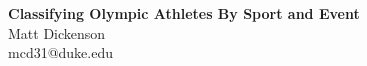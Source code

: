 \documentclass[landscape, paperwidth=42in, paperheight=36in,
fontscale=.35, margin=1in]{baposter}
\begin{document}
\begin{poster}
{        %
\hspace{-1.5in}
} {%
\textsf{
	\bf{Classifying Olympic Athletes By Sport and Event}}
} { %
~\\
  \hspace{-1in}
	\vspace{1em} \textsf{Matt Dickenson}\\
  \vspace{-0.1in}
  \hspace{-1in}
	{\smaller \textsf{mcd31@duke.edu}}
} {%
  \centering
  \setlength\fboxsep{0pt}
        \setlength\fboxrule{0.5pt}
  \hspace{1.6in}
}



\end{poster}
\end{document}
